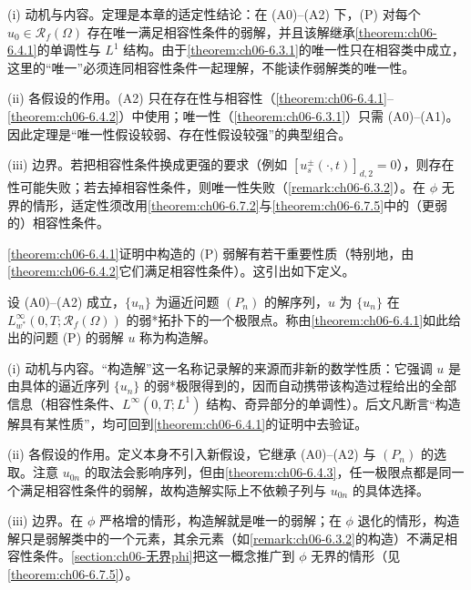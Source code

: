 \documentclass[../../main.tex]{subfiles}%
\begin{document}
\begin{remark}\label{remark:ch06-适定}
(i) 动机与内容。定理是本章的适定性结论：在 (A0)--(A2) 下，(P) 对每个 $u_0\in\mathscr{R}_f(\Omega)$ 存在唯一满足相容性条件的弱解，并且该解继承\cref{theorem:ch06-6.4.1}的单调性与 $L^1$ 结构。由于\cref{theorem:ch06-6.3.1}的唯一性只在相容类中成立，这里的“唯一”必须连同相容性条件一起理解，不能读作弱解类的唯一性。

(ii) 各假设的作用。(A2) 只在存在性与相容性（\cref{theorem:ch06-6.4.1}--\cref{theorem:ch06-6.4.2}）中使用；唯一性（\cref{theorem:ch06-6.3.1}）只需 (A0)--(A1)。因此定理是“唯一性假设较弱、存在性假设较强”的典型组合。

(iii) 边界。若把相容性条件换成更强的要求（例如 $[u^\pm_s(\cdot,t)]_{d,2}=0$），则存在性可能失败；若去掉相容性条件，则唯一性失败（\cref{remark:ch06-6.3.2}）。在 $\phi$ 无界的情形，适定性须改用\cref{theorem:ch06-6.7.2}与\cref{theorem:ch06-6.7.5}中的（更弱的）相容性条件。
\end{remark}

\cref{theorem:ch06-6.4.1}证明中构造的 (P) 弱解有若干重要性质（特别地，由\cref{theorem:ch06-6.4.2}它们满足相容性条件）。这引出如下定义。

\begin{definition}\label{definition:ch06-构造解}
设 (A0)--(A2) 成立，$\{u_n\}$ 为逼近问题 $(P_n)$ 的解序列，$u$ 为 $\{u_n\}$ 在 $L^\infty_{w^*}(0,T;\mathscr{R}_f(\Omega))$ 的弱*拓扑下的一个极限点。称由\cref{theorem:ch06-6.4.1}如此给出的问题 (P) 的弱解 $u$ 称为构造解。
\end{definition}

\begin{remark}\label{remark:ch06-构造解动机}
(i) 动机与内容。“构造解”这一名称记录解的来源而非新的数学性质：它强调 $u$ 是由具体的逼近序列 $\{u_n\}$ 的弱*极限得到的，因而自动携带该构造过程给出的全部信息（相容性条件、$L^\infty(0,T;L^1)$ 结构、奇异部分的单调性）。后文凡断言“构造解具有某性质”，均可回到\cref{theorem:ch06-6.4.1}的证明中去验证。

(ii) 各假设的作用。定义本身不引入新假设，它继承 (A0)--(A2) 与 $(P_n)$ 的选取。注意 $u_{0n}$ 的取法会影响序列，但由\cref{theorem:ch06-6.4.3}，任一极限点都是同一个满足相容性条件的弱解，故构造解实际上不依赖子列与 $u_{0n}$ 的具体选择。

(iii) 边界。在 $\phi$ 严格增的情形，构造解就是唯一的弱解；在 $\phi$ 退化的情形，构造解只是弱解类中的一个元素，其余元素（如\cref{remark:ch06-6.3.2}的构造）不满足相容性条件。\cref{section:ch06-无界phi}把这一概念推广到 $\phi$ 无界的情形（见\cref{theorem:ch06-6.7.5}）。
\end{remark}
\end{document}
